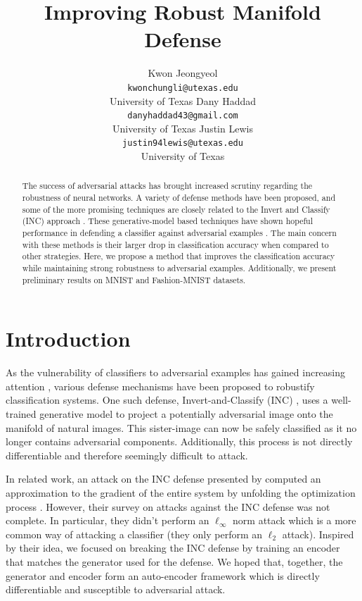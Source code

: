 \documentclass{article}
\title{Improving Robust Manifold Defense}
\author{
  Kwon Jeongyeol \\\texttt{kwonchungli@utexas.edu} \\ University of Texas \And
  Dany Haddad \\\texttt{danyhaddad43@gmail.com} \\ University of Texas
  \And
  Justin Lewis \\\texttt{justin94lewis@utexas.edu} \\
  University of Texas \\
}
\theoremstyle{definition}
\begin{document}

\maketitle

\begin{abstract}
  The success of adversarial attacks has brought increased scrutiny
  regarding the robustness of neural networks. A variety of defense
  methods have been proposed, and some of the more promising
  techniques are closely related to the Invert and Classify (INC)
  approach \cite{ilyas2017}. These generative-model based techniques have shown
  hopeful performance in defending a classifier against adversarial examples
  \cite{athalye2018}. The main concern with these methods is their larger drop
  in classification accuracy when compared to other strategies. Here, we propose
  a method that improves the classification accuracy while maintaining
  strong robustness to adversarial examples. Additionally, we present
  preliminary results on MNIST and Fashion-MNIST datasets.
\end{abstract}

\section{Introduction}
 As the vulnerability of classifiers to adversarial examples has gained increasing attention \cite{2014arXiv1412.6572G}, various defense mechanisms have been proposed to robustify classification systems. One such defense, Invert-and-Classify (INC) \cite{ilyas2017}, uses a well-trained generative model to project a potentially adversarial image onto the manifold of natural images. This sister-image can now be safely classified as it no longer contains adversarial components. Additionally, this process is not directly differentiable and therefore seemingly difficult to attack.

In related work, an attack on the INC defense presented by \cite{athalye2018} computed an approximation to the gradient of the entire system by unfolding the optimization process \cite{athalye2018}. However, their survey on attacks against the INC defense was not complete. In particular, they didn't perform an $\ell_{\infty}$ norm attack which is a more common way of attacking a classifier (they only perform an $\ell_2$ attack). Inspired by their idea, we focused on breaking the INC defense by training an encoder that matches the generator used for the defense. We hoped that, together, the generator and encoder form an auto-encoder framework which is directly differentiable and susceptible to adversarial attack. 
\end{document}
